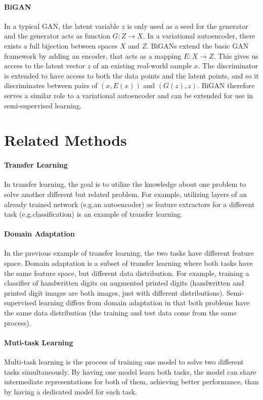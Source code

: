 \paragraph*{BiGAN}
In a typical GAN, the latent variable $z$ is only used as a seed for the generator and the generator acts as function $G: Z \rightarrow X$. In a variational autoencoder, there exists a full bijection between spaces $X$ and $Z$. BiGANs extend the basic GAN framework by adding an encoder, that acts as a mapping $E: X \rightarrow Z$. This gives us access to the latent vector $z$ of an existing real-world sample $x$. The discriminator is extended to have access to both the data points and the latent points, and so it discriminates between pairs of $(x, E(x))$ and $(G(z), z)$. BiGAN therefore serves a similar role to a variational autoencoder and can be extended for use in semi-supervised learning.


\section{Related Methods}
\label{sec:RelatedSslMethods}

\paragraph*{Transfer Learning} In transfer learning, the goal is to utilize the knowledge about one problem to solve another different but related problem. For example, utilizing layers of an already trained network (e.g.\@ an autoencoder) as feature extractors for a different task (e.g.\@ classification) is an example of transfer learning.

\paragraph*{Domain Adaptation} In the previous example of transfer learning, the two tasks have different feature space. Domain adaptation is a subset of transfer learning where both tasks have the same feature space, but different data distribution. For example, training a classifier of handwritten digits on augmented printed digits (handwritten and printed digit images are both images, just with different distributions). Semi-supervised learning differs from domain adaptation in that both problems have the same data distribution (the training and test data come from the same process).

\paragraph*{Muti-task Learning} Multi-task learning is the process of training one model to solve two different tasks simultaneously. By having one model learn both tasks, the model can share intermediate representations for both of them, achieving better performance, than by having a dedicated model for each task.

